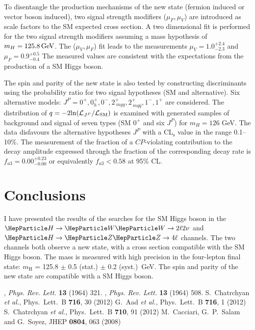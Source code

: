 \documentclass{cimento}
\newcommand{\mH}{\ensuremath{m_{\mathrm{H}}}\xspace}
\newcommand{\GeV}{\ensuremath{\,\text{Ge\hspace{-.08em}V}}\xspace}
\newcommand{\cPZ}{\PZ} %
\newcommand{\hzzfl}{\ensuremath{\PH\to\cPZ\cPZ\to4\ell}}
\newcommand{\hwwtl}{\ensuremath{\PH\to\PW\PW\to2\ell2\nu}}
\begin{document}
To disentangle the production mechanisms of the new state (fermion
induced or vector boson induced), two signal strength modifiers
($\mu_F, \mu_V$) are introduced as scale factors to the SM expected
cross section. A two dimensional fit is performed for the two signal
strength modifiers assuming a mass hypothesis of $m_H = 125.8 \GeV$.
The ($\mu_V,\mu_F$) fit leads to the measurements $\mu_V =
1.0^{+2.4}_{-2.3}$ and $\mu_F = 0.9^{+0.5}_{-0.4}$ The measured values
are consistent with the expectations from the production of a SM Higgs
boson.

The spin and parity of the new state is also tested by constructing
discriminants using the probability ratio for two signal hypotheses
(SM and alternative). Six alternative models: $J^P=0^+, 0_h^+, 0^-,
2_{~mgg}^+, 2_{~mq\bar{q}}^+, 1^-, 1^+$ are considered. The
distribution of $q=-2{\ln({\cal L}_{J^P}/{\cal L}_{\rm SM})}$ is
examined with generated samples of background and signal of seven
types (SM $0^+$ and six $J^P$) for $m_H =126$ GeV. The data disfavours
the alternative hypotheses $J^P$ with a $\mathrm{CL_s}$ value in the
range 0.1--10\%. The measurement of the fraction of a $C\!P$-violating
contribution to the decay amplitude expressed through the fraction of
the corresponding decay rate is $f_{a3}=0.00^{+0.23}_{-0.00}$ or
equivalently $f_{a3}<0.58$ at 95\% CL.

\section{Conclusions}
\label{sec:Conclusions}

I have presented the results of the searches for the SM Higgs boson in
the $\hwwtl$ and $\hzzfl$ channels. The two channels both observe a
new state, with a cross section compatible with the SM Higgs boson.
The mass is measured with high precision in the four-lepton final
state: $\mH$ = 125.8 $\pm$ 0.5 (stat.) $\pm$ 0.2 (syst.)~GeV.  The
spin and parity of the new state are compatible with a SM Higgs boson.

\begin{thebibliography}{0}




, \textit{ Phys. Rev. Lett.} \textbf{ 13} (1964) 321.
, \textit{ Phys. Rev. Lett.} \textbf{ 13} (1964) 508.
 S.~Chatrchyan {\it et al.}, Phys.\ Lett.\ B {\bf 716}, 30 (2012)
 G.~Aad {\it et al.}, Phys.\ Lett.\ B {\bf 716}, 1 (2012)
 S.~Chatrchyan {\it et al.},  Phys.\ Lett.\ B {\bf 710}, 91 (2012)
 M.~Cacciari, G.~P.~Salam and G.~Soyez, JHEP {\bf 0804}, 063 (2008)

\end{thebibliography}
\end{document}
